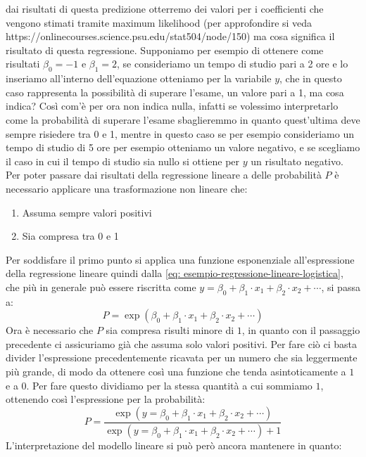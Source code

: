 \documentclass[]{article}
\begin{document}
dai risultati di questa predizione otterremo dei valori per i coefficienti che vengono stimati tramite maximum likelihood (per approfondire si veda https://onlinecourses.science.psu.edu/stat504/node/150) ma cosa significa il risultato di questa regressione. Supponiamo per esempio di ottenere come risultati $\beta_0 = -1$ e $\beta_1 = 2$, se consideriamo un tempo di studio pari a 2 ore e lo inseriamo all'interno dell'equazione otteniamo per la variabile $y$, che in questo caso rappresenta la possibilità di superare l'esame, un valore pari a 1, ma cosa indica? Così com'è per ora non indica nulla, infatti se volessimo interpretarlo come la probabilità di superare l'esame sbaglieremmo in quanto quest'ultima deve sempre risiedere tra 0 e 1, mentre in questo caso se per esempio consideriamo un tempo di studio di 5 ore per esempio otteniamo un valore negativo, e se scegliamo il caso in cui il tempo di studio sia nullo si ottiene per $y$ un risultato negativo. Per poter passare dai risultati della regressione lineare a delle probabilità $P$ è necessario applicare una trasformazione non lineare che:
\begin{enumerate}
\item Assuma sempre valori positivi
\item Sia compresa tra 0 e 1
\end{enumerate} 
Per soddisfare il primo punto si applica una funzione esponenziale all'espressione della regressione lineare quindi dalla \eqref{eq: esempio-regressione-lineare-logistica}, che più in generale può essere riscritta come $y = \beta_0 + \beta_1 \cdot x_1 + \beta_2 \cdot x_2 + \cdots$, si passa a:
\begin{equation}
P = \exp(\beta_0 + \beta_1 \cdot x_1 + \beta_2 \cdot x_2 + \cdots)
\end{equation}
Ora è necessario che $P$ sia compresa risulti minore di $1$, in quanto con il passaggio precedente ci assicuriamo già che assuma solo valori positivi. Per fare ciò ci basta divider l'espressione precedentemente ricavata per un numero che sia leggermente più grande, di modo da ottenere così una funzione che tenda asintoticamente a $1$ e a $0$. Per fare questo dividiamo per la stessa quantità a cui sommiamo $1$, ottenendo così l'espressione per la probabilità:
\begin{equation}
P = \frac{\exp(y = \beta_0 + \beta_1 \cdot x_1 + \beta_2 \cdot x_2 + \cdots)}{\exp(y = \beta_0 + \beta_1 \cdot x_1 + \beta_2 \cdot x_2 + \cdots) + 1}
\end{equation}
L'interpretazione del modello lineare si può però ancora mantenere in quanto:
\end{document}
